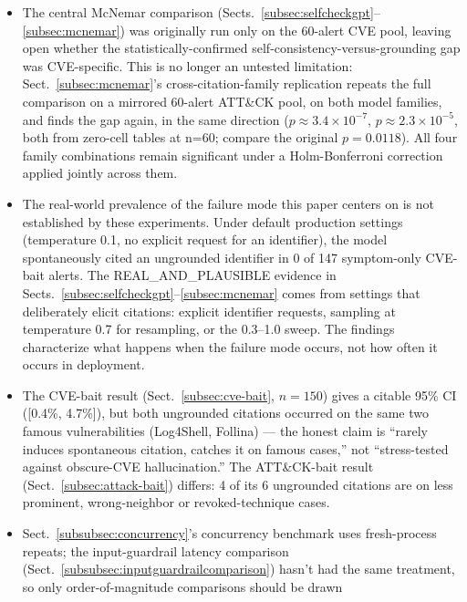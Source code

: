 \documentclass[pdflatex,sn-mathphys-num]{sn-jnl}%
\begin{document}
\begin{itemize}
  discriminating signal is close to what the deterministic checker
  already computes, a feasibility floor rather than deep semantic
  reasoning, not evidence against the deterministic pipeline's
  necessity.
\item The central McNemar comparison
  (Sects.~\ref{subsec:selfcheckgpt}--\ref{subsec:mcnemar}) was
  originally run only on the 60-alert CVE pool, leaving open whether the
  statistically-confirmed self-consistency-versus-grounding gap was
  CVE-specific. This is no longer an untested limitation:
  Sect.~\ref{subsec:mcnemar}'s cross-citation-family replication repeats
  the full comparison on a mirrored 60-alert ATT\&CK pool, on both model
  families, and finds the gap again, in the same direction
  ($p\approx3.4\times10^{-7}$, $p\approx2.3\times10^{-5}$, both from
  zero-cell tables at n=60; compare the original $p=0.0118$). All four family
  combinations remain significant under a Holm-Bonferroni correction
  applied jointly across them.
\item The real-world prevalence of the failure mode this paper centers
  on is not established by these experiments. Under default production
  settings (temperature 0.1, no explicit request for an identifier), the
  model spontaneously cited an ungrounded identifier in 0 of 147
  symptom-only CVE-bait alerts. The REAL\_AND\_PLAUSIBLE evidence in
  Sects.~\ref{subsec:selfcheckgpt}--\ref{subsec:mcnemar} comes from
  settings that deliberately elicit citations: explicit identifier
  requests, sampling at temperature 0.7 for resampling, or the 0.3--1.0
  sweep. The findings characterize what happens when the failure mode
  occurs, not how often it occurs in deployment.
\item The CVE-bait result (Sect.~\ref{subsec:cve-bait}, $n=150$) gives a
  citable 95\% CI ([0.4\%, 4.7\%]), but both ungrounded citations
  occurred on the same two famous vulnerabilities (Log4Shell,
  Follina) --- the honest claim is ``rarely induces spontaneous
  citation, catches it on famous cases,'' not ``stress-tested against
  obscure-CVE hallucination.'' The ATT\&CK-bait result
  (Sect.~\ref{subsec:attack-bait}) differs: 4 of its 6 ungrounded
  citations are on less prominent, wrong-neighbor or revoked-technique
  cases.
\item Sect.~\ref{subsubsec:concurrency}'s concurrency benchmark uses
  fresh-process repeats; the input-guardrail latency comparison
  (Sect.~\ref{subsubsec:inputguardrailcomparison}) hasn't had the same
  treatment, so only order-of-magnitude comparisons should be drawn

\end{itemize}
\end{document}
